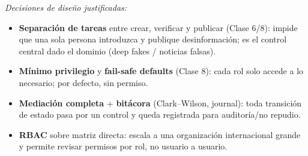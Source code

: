 \emph{Decisiones de diseño justificadas:}
\begin{itemize}
  \item \textbf{Separación de tareas} entre crear, verificar y publicar (Clase 6/8): impide que una sola persona introduzca y publique desinformación; es el control central dado el dominio (deep fakes / noticias falsas).
  \item \textbf{Mínimo privilegio} y \textbf{fail-safe defaults} (Clase 8): cada rol solo accede a lo necesario; por defecto, sin permiso.
  \item \textbf{Mediación completa} + \textbf{bitácora} (Clark--Wilson, journal): toda transición de estado pasa por un control y queda registrada para auditoría/no repudio.
  \item \textbf{RBAC} sobre matriz directa: escala a una organización internacional grande y permite revisar permisos por rol, no usuario a usuario.
\end{itemize}
